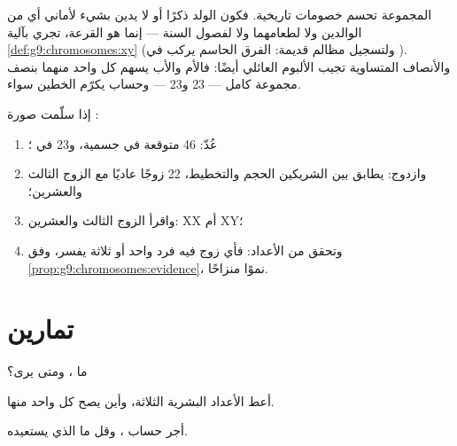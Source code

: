 \begin{example}\label{ex:g9:chromosomes:answers}
المجموعة تحسم خصومات تاريخية. فكون الولد ذكرًا أو 
لا يدين بشيء لأماني أي من الوالدين ولا لطعامهما ولا
لفصول السنة --- إنما هو القرعة، تجري بآلية
\cref{def:g9:chromosomes:xy} (ولتسجيل مظالم قديمة:
الفرق الحاسم يركب في \emph{}). والأنصاف المتساوية
تجيب الألبوم العائلي أيضًا: فالأم والأب يسهم كل واحد
منهما بنصف مجموعة كامل --- 23 و23 --- وحساب 
يكرّم الخطين سواء.
\end{example}

\begin{method}\label{met:g9:chromosomes:read}
إذا سلّمت صورة :
\begin{enumerate}
  \item عُدّ: 46 متوقعة في  جسمية، و23 في ؛
  \item وازدوج: يطابق بين الشريكين الحجم والتخطيط، 22
        زوجًا عاديًا مع الزوج الثالث والعشرين؛
  \item واقرأ الزوج الثالث والعشرين: XX أم XY؛
  \item وتحقق من الأعداد: فأي زوج فيه فرد واحد أو ثلاثة
        يفسر، وفق \cref{prop:g9:chromosomes:evidence}،
        نموًا منزاحًا.
\end{enumerate}
\end{method}

\section{تمارين}

\begin{exercise}[$\star$]\label{exo:g9:chromosomes:1}
ما ، ومتى يرى؟
\end{exercise}

\begin{exercise}[$\star$]\label{exo:g9:chromosomes:2}
أعط الأعداد البشرية الثلاثة، وأين يصح كل واحد منها.
\end{exercise}

\begin{exercise}[$\star$]\label{exo:g9:chromosomes:3}
أجر حساب ، وقل ما الذي يستعيده.
\end{exercise}


